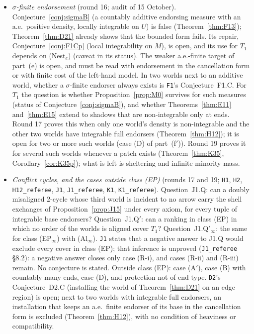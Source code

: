 \documentclass[11pt]{article}
\theoremstyle{definition}
\theoremstyle{remark}
\newcommand{\src}[1]{\texttt{#1}}
\begin{document}
\begin{itemize}[leftmargin=*]
\item \emph{$\sigma$-finite endorsement} (round 16; audit of 15 October). Conjecture~\ref{conj:sigmaB} (a countably additive endorsing measure with an a.e.\ positive density, locally integrable on $U$) is false (Theorem~\ref{thm:F13}); Theorem~\ref{thm:D21} already shows that the bounded form fails. Its repair, Conjecture~\ref{conj:F1Cp} (local integrability on $M$), is open, and its use for $T_1$ depends on (Nest$_e$) (caveat in its status). The weaker a.e.-finite target of part~(e) is open, and must be read with endorsement in the cancellation form or with finite cost of the left-hand model. In two worlds next to an additive world, whether a $\sigma$-finite endorser always exists is \src{F1}'s Conjecture~F1.C. For $T_1$ the question is whether Proposition~\ref{prop:M0} survives for such measures (status of Conjecture~\ref{conj:sigmaB}), and whether Theorems~\ref{thm:E11} and~\ref{thm:E15} extend to shadows that are non-integrable only at ends. Round 17 proves this when only one world's density is non-integrable and the other two worlds have integrable full endorsers (Theorem~\ref{thm:H12}); it is open for two or more such worlds (case (D) of part~(f$'$)). Round 19 proves it for several such worlds whenever a patch exists (Theorem~\ref{thm:K35}, Corollary~\ref{cor:K35p}); what is left is sheltering and infinite minority mass.
\item \emph{Conflict cycles, and the cases outside class (EP)} (rounds 17 and 19; \src{H1}, \src{H2}, \src{H12\_referee}, \src{J1}, \src{J1\_referee}, \src{K1}, \src{K1\_referee}). Question~J1.Q: can a doubly misaligned $2$-cycle whose third world is incident to no arrow carry the shell exchanges of Proposition~\ref{prop:J15} under every axiom, for every tuple of integrable base endorsers? Question~J1.Q$'$: can a ranking in class (EP) in which no order of the worlds is aligned cover $T_1$? Question~J1.Q$'_\infty$: the same for class (EP$_\infty$) with (Al$_\infty$). \src{J1} states that a negative answer to J1.Q would exclude every cover in class (EP); that inference is unproved (\src{J1\_referee} \S8.2): a negative answer closes only case (R-i), and cases (R-ii) and (R-iii) remain. No conjecture is stated. Outside class (EP): case (A$'$), case (B) with countably many ends, case (D), and protection not of end type. \src{D2}'s Conjecture~D2.C (installing the world of Theorem~\ref{thm:D21} on an edge region) is open; next to two worlds with integrable full endorsers, an installation that keeps an a.e.\ finite endorser of its base in the cancellation form is excluded (Theorem~\ref{thm:H12}), with no condition of heaviness or compatibility.

\end{itemize}
\end{document}
